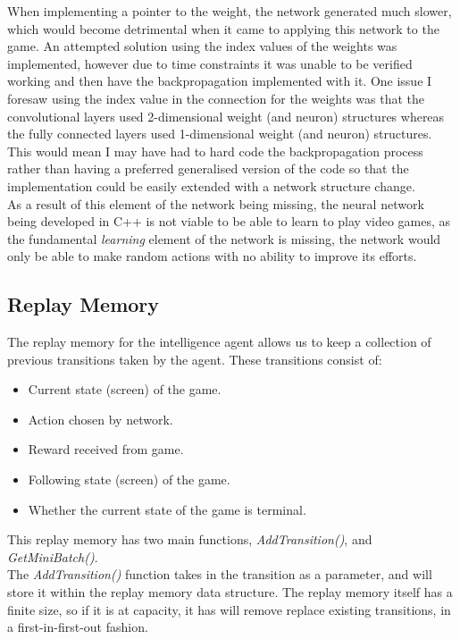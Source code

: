 \documentclass[10pt]{article}
\begin{document}
		When implementing a pointer to the weight, the network generated much slower, which would become detrimental when it came to applying this network to the game. An attempted solution using the index values of the weights was implemented, however due to time constraints it was unable to be verified working and then have the backpropagation implemented with it. One issue I foresaw using the index value in the connection for the weights was that the convolutional layers used 2-dimensional weight (and neuron) structures whereas the fully connected layers used 1-dimensional weight (and neuron) structures. This would mean I may have had to hard code the backpropagation process rather than having a preferred generalised version of the code so that the implementation could be easily extended with a network structure change.\\

		
		As a result of this element of the network being missing, the neural network being developed in C++ is not viable to be able to learn to play video games, as the fundamental \textit{learning} element of the network is missing, the network would only be able to make random actions with no ability to improve its efforts.
	\medskip
	
	\subsection{Replay Memory}
		The replay memory for the intelligence agent allows us to keep a collection of previous transitions taken by the agent. These transitions consist of:
		\begin{itemize}
			\item Current state (screen) of the game.
			\item Action chosen by network.
			\item Reward received from game.
			\item Following state (screen) of the game.
			\item Whether the current state of the game is terminal.
		\end{itemize}
		
		This replay memory has two main functions, \textit{AddTransition()}, and \textit{GetMiniBatch()}.\\
		
		The \textit{AddTransition()} function takes in the transition as a parameter, and will store it within the replay memory data structure. The replay memory itself has a finite size, so if it is at capacity, it has will remove replace existing transitions, in a first-in-first-out fashion.\\
		
\end{document}
